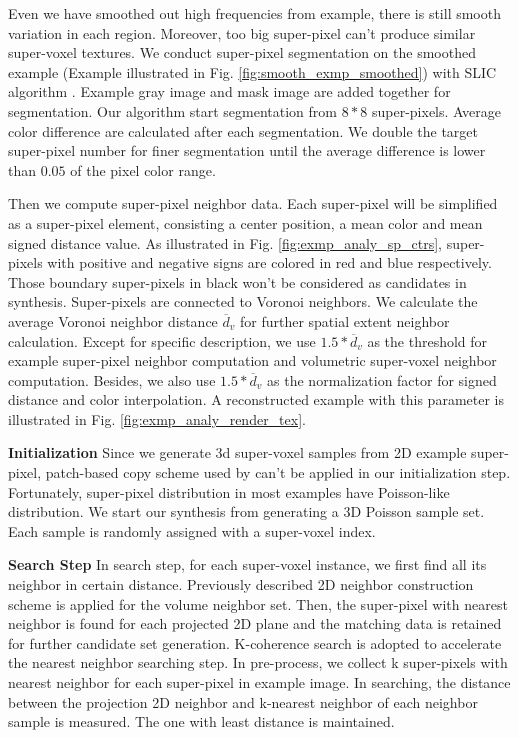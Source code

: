 
Even we have smoothed out high frequencies from example, there is still smooth variation in each region. Moreover, too big super-pixel can't produce similar super-voxel textures. We conduct super-pixel segmentation on the smoothed example (Example illustrated in Fig. \ref{fig:smooth_exmp_smoothed}) with SLIC algorithm \cite{achanta2012slic}. Example gray image and mask image are added together for segmentation. Our algorithm start segmentation from $8*8$ super-pixels. Average color difference are calculated after each segmentation. We double the target super-pixel number for finer segmentation until the average difference is lower than $0.05$ of the pixel color range. 

Then we compute super-pixel neighbor data. Each super-pixel will be simplified as a super-pixel element, consisting a center position, a mean color and mean signed distance value. As illustrated in Fig. \ref{fig:exmp_analy_sp_ctrs}, super-pixels with positive and negative signs are colored in red and blue respectively. Those boundary super-pixels in black won't be considered as candidates in synthesis. Super-pixels are connected to Voronoi neighbors. We calculate the average Voronoi neighbor distance $\overline{d}_v$ for further spatial extent neighbor calculation. Except for specific description, we use $1.5*\overline{d}_v$ as the threshold for example super-pixel neighbor computation and volumetric super-voxel neighbor computation. Besides, we also use $1.5*\overline{d}_v$ as the normalization factor for signed distance and color interpolation. A reconstructed example with this parameter is illustrated in Fig. \ref{fig:exmp_analy_render_tex}. 

\noindent
\textbf{Initialization}
Since we generate 3d super-voxel samples from 2D example super-pixel, patch-based copy scheme used by \cite{ma2011discrete} can't be applied in our initialization step. Fortunately, super-pixel distribution in most examples have Poisson-like distribution. We start our synthesis from generating a 3D Poisson sample set. Each sample is randomly assigned with a super-voxel index.

\noindent
\textbf{Search Step} In search step, for each super-voxel instance, we first find all its neighbor in certain distance. Previously described 2D neighbor construction scheme is applied for the volume neighbor set. Then, the super-pixel with nearest neighbor is found for each projected 2D plane and the matching data is retained for further candidate set generation. K-coherence search \cite{tong2002synthesis} is adopted to accelerate the nearest neighbor searching step. In pre-process, we collect k super-pixels with nearest neighbor for each super-pixel in example image. In searching, the distance between the projection 2D neighbor and k-nearest neighbor of each neighbor sample is measured. The one with least distance is maintained.

